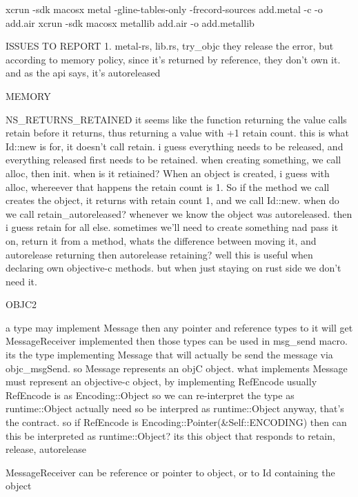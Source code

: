 
xcrun -sdk macosx metal -gline-tables-only -frecord-sources add.metal -c -o add.air
xcrun -sdk macosx metallib add.air -o add.metallib


ISSUES TO REPORT
1.
metal-rs, lib.rs, try_objc
they release the error, but according to memory policy, since it's returned by reference, they don't own it. and as the api says, it's autoreleased







MEMORY

NS_RETURNS_RETAINED
it seems like the function returning the value calls retain before it returns, thus returning a value with +1 retain count. this is what Id::new is for, it doesn't call retain. 
i guess everything needs to be released, and everything released first needs to be retained.
when creating something, we call alloc, then init. when is it retiained?
When an object is created, i guess with alloc, whereever that happens the retain count is 1.
So if the method we call creates the object, it returns with retain count 1, and we call Id::new.
when do we call retain_autoreleased? whenever we know the object was autoreleased. then i guess retain for all else. 
sometimes we'll need to create something nad pass it on, return it from a method,
whats the difference between moving it, and autorelease returning then autorelease retaining? well this is useful when declaring own objective-c methods. but when just staying on rust side we don't need it. 









OBJC2

a type may implement Message
then any pointer and reference types to it will get MessageReceiver implemented
then those types can be used in msg_send macro.
its the type implementing Message that will actually be send the message via objc_msgSend.
so Message represents an objC object.
what implements Message must represent an objective-c object, by implementing RefEncode
usually RefEncode is as Encoding::Object so we can re-interpret the type as runtime::Object
actually need so be interpred as runtime::Object anyway, that's the contract. so if RefEncode is Encoding::Pointer(&Self::ENCODING) then can this be interpreted as runtime::Object?
its this object that responds to retain, release, autorelease

MessageReceiver can be reference or pointer to object, or to Id containing the object


